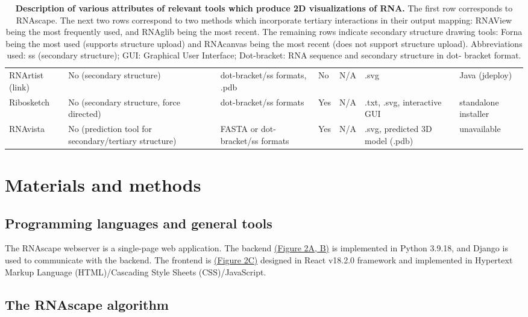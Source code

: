 \begin{table}[]
{\begin{tabular}{lllllll}
RNArtist (link) & No (secondary structure) & dot-bracket/ss formats, .pdb & No & N/A & .svg & Java (jdeploy) \\
Ribosketch \citep{Lu2018} & No (secondary structure, force   directed) & dot-bracket/ss formats & Yes & N/A & .txt, .svg, interactive GUI & standalone installer \\
RNAvista \citep{antczak2019rnavista} & No (prediction tool for secondary/tertiary   structure) & FASTA or dot-bracket/ss formats & Yes & N/A & .svg, predicted 3D model (.pdb) & unavailable
\end{tabular}%
}
\caption[Description of various attributes of relevant tools which produce 2D visualizations of RNA.]{\textbf{Description of various attributes of relevant tools which produce 2D visualizations of RNA.} The first row corresponds to RNAscape. The next two rows correspond to two methods which incorporate tertiary interactions in their output mapping: RNAView \citep{Yang2003} being the most
frequently used, and RNAglib \citep{Mallet2022} being the most recent. The remaining rows indicate secondary
structure drawing tools: Forna \citep{Kerpedjiev2015} being the most used (supports structure upload) and RNAcanvas \citep{Johnson2023} being the most recent (does not support structure upload). Abbreviations used: ss (secondary
structure); GUI: Graphical User Interface; Dot-bracket: RNA sequence and secondary structure in dot-
bracket format.}
\end{table}

\section{Materials and methods} 

\subsection{Programming languages and general tools}

The RNAscape webserver is a single-page web application. The backend \hyperref[fig:rnascape2]{(Figure 2A, B)} is implemented in Python 3.9.18, and Django \citep{Django2019} is used to communicate with the backend. The frontend is \hyperref[fig:rnascape2]{(Figure 2C)} designed in React v18.2.0 framework and implemented in Hypertext Markup Language (HTML)/Cascading Style Sheets (CSS)/JavaScript.

\subsection{The RNAscape algorithm}

